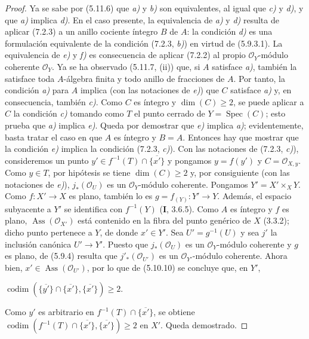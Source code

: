 \begin{proof}
Ya se sabe por (5.11.6) que \emph{a)} y \emph{b)} son equivalentes, al igual que
\emph{c)} y \emph{d)}, y que \emph{a)} implica \emph{d)}. En el caso presente, la equivalencia
de \emph{a)} y \emph{d)} resulta de aplicar (7.2.3) a un anillo cociente íntegro
$B$ de $A$: la condición \emph{d)} es una formulación equivalente de la
condición (7.2.3, \emph{b)}) en virtud de (5.9.3.1). La equivalencia de \emph{e)}
y \emph{f)} es consecuencia de aplicar (7.2.2) al propio
$\mathscr O_Y$-módulo coherente $\mathscr O_Y$. Ya se ha observado
(5.11.7, (ii)) que, si $A$ satisface \emph{a)}, también la satisface toda
$A$-álgebra finita y todo anillo de fracciones de $A$. Por tanto,
la condición \emph{a)} para $A$ implica (con las notaciones de \emph{e)}) que
$C$ satisface \emph{a)} y, en consecuencia, también \emph{c)}. Como $C$ es
íntegro y $\dim(C)\geqslant
2$, se puede aplicar a $C$ la condición
\emph{c)} tomando como $T$ el punto cerrado de $Y=\operatorname{Spec}(C)$;
esto prueba que \emph{a)} implica \emph{e)}. Queda por demostrar que \emph{e)}
implica \emph{a)}; evidentemente, basta tratar el caso en que $A$ es íntegro y $B=A$.
Entonces hay que mostrar que la condición \emph{e)} implica la condición
(7.2.3, \emph{c)}). Con las notaciones de (7.2.3, \emph{c)}), consideremos un punto
$y'\in f^{-1}(T)\cap\overline{\{x'\}}$ y pongamos $y=f(y')$
y $C=\mathscr O_{X,y}$. Como $y\in T$, por hipótesis se tiene
$\dim(C)\geqslant2$ y, por consiguiente (con las notaciones de \emph{e)}),
$j_*(\mathscr O_U)$ es un $\mathscr O_Y$-módulo coherente. Pongamos
$Y'=X'\times_XY$. Como $f:X'\to X$ es plano, también lo es
$g=f_{(Y)}:Y'\to Y$. Además, el espacio subyacente a $Y'$ se
identifica con $f^{-1}(Y)$ (\textbf I, 3.6.5). Como $A$ es íntegro y $f$
es plano, $\operatorname{Ass}(\mathscr O_{X'})$ está contenido en
la fibra del punto genérico de $X$ (3.3.2); dicho punto pertenece
a $Y$, de donde $x'\in Y'$. Sea $U'=g^{-1}(U)$ y sea $j'$ la
inclusión canónica $U'\to Y'$. Puesto que
$j_*(\mathscr O_U)$ es un $\mathscr O_Y$-módulo coherente y $g$
es plano, de (5.9.4) resulta que $j'_*(\mathscr O_{U'})$ es un
$\mathscr O_{Y'}$-módulo coherente. Ahora bien,
$x'\in\operatorname{Ass}(\mathscr O_{U'})$, por lo que de
(5.10.10) se concluye que, en $Y'$,


$\operatorname{codim}(\overline{\{y'\}}\cap\overline{\{x'\}},
\overline{\{x'\}})\geqslant2$.

Como $y'$ es arbitrario en
$f^{-1}(T)\cap\overline{\{x'\}}$, se obtiene
$\operatorname{codim}(f^{-1}(T)\cap\overline{\{x'\}},
\overline{\{x'\}})\geqslant2$ en $X'$. Queda demostrado.
\end{proof}
